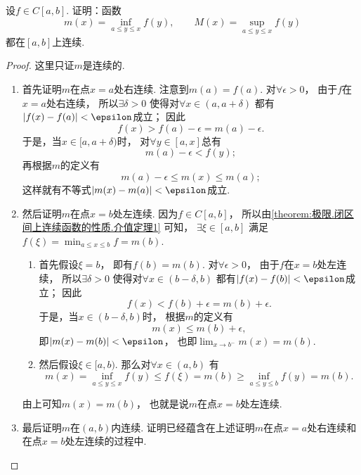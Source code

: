 \begin{example}
设\(f \in C[a,b]\).
证明：函数\begin{equation*}
	m(x) = \inf_{a \leq y \leq x} f(y), \qquad
	M(x) = \sup_{a \leq y \leq x} f(y)
\end{equation*}都在\([a,b]\)上连续.
\begin{proof}
这里只证\(m\)是连续的.
\begin{enumerate}
	\item 首先证明\(m\)在点\(x=a\)处右连续.
	注意到\(m(a) = f(a)\).
	对\(\forall\epsilon>0\)，
	由于\(f\)在\(x=a\)处右连续，
	所以\(\exists\delta>0\)
	使得对\(\forall x\in(a,a+\delta)\)
	都有\(\abs{f(x)-f(a)}<\epsilon\)成立；
	因此\begin{equation*}
	f(x)
	> f(a) - \epsilon
	= m(a) - \epsilon.
	\end{equation*}
	于是，当\(x\in[a,a+\delta)\)时，
	对\(\forall y\in[a,x]\)总有\begin{equation*}
		m(a) - \epsilon < f(y);
	\end{equation*}
	再根据\(m\)的定义有\begin{equation*}
		m(a) - \epsilon \leq m(x) \leq m(a);
	\end{equation*}
	这样就有不等式\(\abs{m(x)-m(a)}<\epsilon\)成立.

	\item 然后证明\(m\)在点\(x=b\)处左连续.
	因为\(f \in C[a,b]\)，
	所以由\cref{theorem:极限.闭区间上连续函数的性质.介值定理1} 可知，
	\(\exists\xi\in[a,b]\)
	满足\(f(\xi) = \min_{a \leq x \leq b} f = m(b)\).
		\begin{enumerate}
			\item 首先假设\(\xi=b\)，
			即有\(f(b)=m(b)\).
			对\(\forall\epsilon>0\)，
			由于\(f\)在\(x=b\)处左连续，
			所以\(\exists\delta>0\)
			使得对\(\forall x\in(b-\delta,b)\)
			都有\(\abs{f(x)-f(b)}<\epsilon\)成立；
			因此\begin{equation*}
				f(x)
				< f(b) + \epsilon
				= m(b) + \epsilon.
			\end{equation*}
			于是，当\(x\in(b-\delta,b)\)时，
			根据\(m\)的定义有\begin{equation*}
				m(x) \leq m(b) + \epsilon,
			\end{equation*}
			即\(\abs{m(x)-m(b)}<\epsilon\)，
			也即\(\lim_{x \to b^-} m(x) = m(b)\).

			\item 然后假设\(\xi\in[a,b)\).
			那么对\(\forall x\in(a,b)\)
			有\begin{equation*}
				m(x) = \inf_{a \leq y \leq x} f(y)
				\leq f(\xi)
				= m(b)
				\geq \inf_{a \leq y \leq b} f(y)
				= m(b).
			\end{equation*}
		\end{enumerate}
		由上可知\(m(x) = m(b)\)，
		也就是说\(m\)在点\(x=b\)处左连续.

	\item 最后证明\(m\)在\((a,b)\)内连续.
	证明已经蕴含在上述证明\(m\)在点\(x=a\)处右连续和在点\(x=b\)处左连续的过程中.
	\qedhere
\end{enumerate}
\end{proof}
\end{example}
